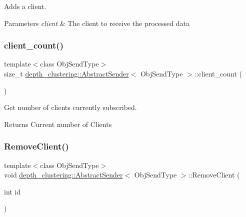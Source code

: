 Adds a client. 


\begin{DoxyParams}{Parameters}
{\em client} & The client to receive the processed data \\
\hline
\end{DoxyParams}
\mbox{\label{classdepth__clustering_1_1AbstractSender_a957331eb41f11208bbe6174895c11bf2}} 
\subsubsection{\texorpdfstring{client\+\_\+count()}{client\_count()}}
{\footnotesize\ttfamily template$<$class Obj\+Send\+Type$>$ \\
size\+\_\+t \hyperlink{classdepth__clustering_1_1AbstractSender}{depth\+\_\+clustering\+::\+Abstract\+Sender}$<$ Obj\+Send\+Type $>$\+::client\+\_\+count (\begin{DoxyParamCaption}{ }\end{DoxyParamCaption})\hspace{0.3cm}{\ttfamily [inline]}}



Get number of clients currently subscribed. 

\begin{DoxyReturn}{Returns}
Current number of Clients 
\end{DoxyReturn}
\mbox{\label{classdepth__clustering_1_1AbstractSender_a0c33c98abe8fa71a86f02af95b1c71c1}} 
\subsubsection{\texorpdfstring{Remove\+Client()}{RemoveClient()}}
{\footnotesize\ttfamily template$<$class Obj\+Send\+Type$>$ \\
void \hyperlink{classdepth__clustering_1_1AbstractSender}{depth\+\_\+clustering\+::\+Abstract\+Sender}$<$ Obj\+Send\+Type $>$\+::Remove\+Client (\begin{DoxyParamCaption}\item[{int}]{id }\end{DoxyParamCaption})\hspace{0.3cm}{\ttfamily [inline]}}




